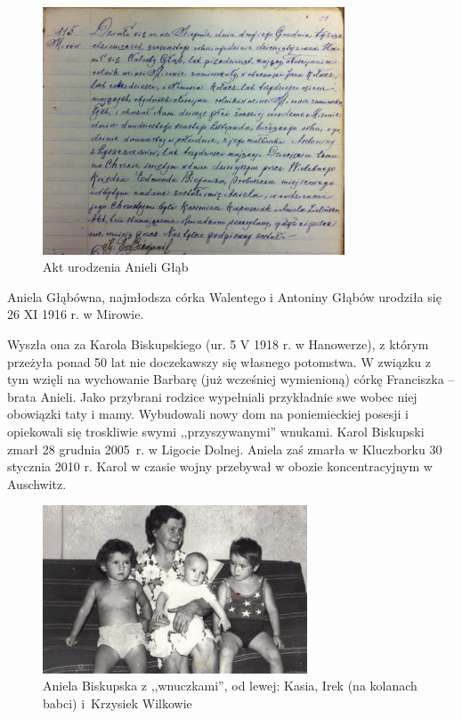 \begin{figure}[!h]
\begin{center}
\includegraphics[width=0.8\textwidth]{zdjecia/akt_urodzenia_anieli_glab.jpg}
\caption{Akt urodzenia Anieli Głąb}
\label{rys:akt_urodzenia_anieli_glab}
\end{center}
\end{figure}

Aniela Głąbówna, najmłodsza córka Walentego i Antoniny Głąbów urodziła się 26 XI 1916 r. w Mirowie.

Wyszła ona za Karola Biskupskiego (ur. 5 V 1918 r. w Hanowerze), z którym przeżyła ponad 50 lat nie doczekawszy się własnego potomstwa. W związku z tym wzięli na wychowanie Barbarę (już wcześniej wymienioną) córkę Franciszka -- brata Anieli. Jako przybrani rodzice wypełniali przykładnie swe wobec niej obowiązki taty i mamy. Wybudowali nowy dom na poniemieckiej posesji i opiekowali się troskliwie swymi ,,przyszywanymi'' wnukami. Karol Biskupski zmarł 28 grudnia 2005~r. w Ligocie Dolnej. Aniela zaś zmarła w Kluczborku 30 stycznia 2010 r. Karol w czasie wojny przebywał w obozie koncentracyjnym w Auschwitz.

\begin{figure}[!h]
\begin{center}
\includegraphics[width=0.7\textwidth]{zdjecia/aniela_biskupska_z_wnuczkami.jpg}
\caption[Aniela Biskupska z wnuczkami]{Aniela Biskupska z ,,wnuczkami'', od lewej: Kasia, Irek (na kolanach babci) i~Krzysiek Wilkowie}
\label{rys:aniela_biskupska_z_wnuczkami}
\end{center}
\end{figure}


